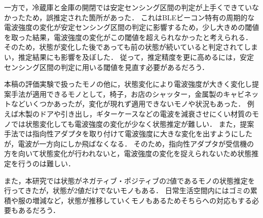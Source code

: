 一方で，冷蔵庫と金庫の開閉では安定センシング区間の判定が上手くできていなかったため，誤推定された箇所があった．
これはBLEビーコン特有の周期的な電波強度の変化が安定センシング区間の判定に影響するため，少し大きめの閾値を取った結果，電波強度の変化がこの閾値を超えられなかったと考えられる．
そのため，状態が変化した後であっても前の状態が続いていると判定されてしまい，推定結果にも影響を及ぼした．
従って，推定精度を更に高めるには，安定センシング区間の判定に用いる閾値を見直す必要があるだろう．

本稿の評価実験で扱ったモノの他に，状態変化により電波強度が大きく変化し提案手法が適用できるモノとして，椅子，お店のシャッター，金属製のキャビネットなどいくつかあったが，変化が現れず適用できないモノや状況もあった．
例えば木製のドアや引き出し，ギターケースなどの電波を減衰させにくい材質のモノでは状態変化しても電波強度の変化が少なく状態推定が難しい．
また，提案手法では指向性アダプタを取り付けて電波強度に大きな変化を出すようにしたが，電波が一方向にしか飛ばなくなる．
そのため，指向性アダプタが受信機の方を向いて状態変化が行われないと，電波強度の変化を捉えられないため状態推定を行うのは難しい．

また，本研究では状態がネガティブ・ポジティブの2値であるモノの状態推定を行ってきたが，状態が2値だけでないモノもある．
日常生活空間内にはゴミの累積や服の増減など，状態が推移していくモノもあるためそちらへの対応もする必要もあるだろう．
